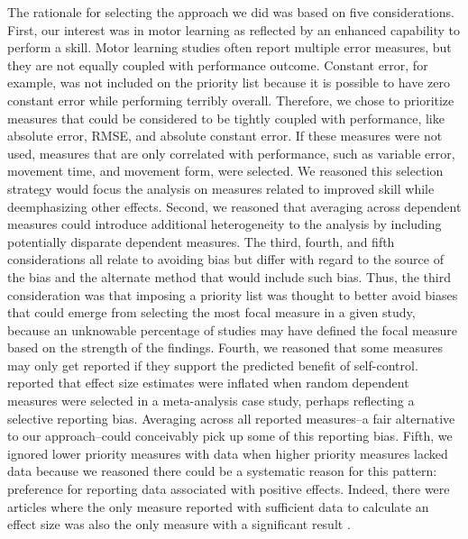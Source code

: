 \documentclass[man,floatsintext,hidelinks]{apa7}
\begin{document}
The rationale for selecting the approach we did was based on five considerations. First, our interest was in motor learning as reflected by an enhanced capability to perform a skill. Motor learning studies often report multiple error measures, but they are not equally coupled with performance outcome. Constant error, for example, was not included on the priority list because it is possible to have zero constant error while performing terribly overall. Therefore, we chose to prioritize measures that could be considered to be tightly coupled with performance, like absolute error, RMSE, and absolute constant error. If these measures were not used, measures that are only correlated with performance, such as variable error, movement time, and movement form, were selected. We reasoned this selection strategy would focus the analysis on measures related to improved skill while deemphasizing other effects. Second, we reasoned that averaging across dependent measures could introduce additional heterogeneity to the analysis by including potentially disparate dependent measures. The third, fourth, and fifth considerations all relate to avoiding bias but differ with regard to the source of the bias and the alternate method that would include such bias. Thus, the third consideration was that imposing a priority list was thought to better avoid biases that could emerge from selecting the most focal measure in a given study, because an unknowable percentage of studies may have defined the focal measure based on the strength of the findings. Fourth, we reasoned that some measures may only get reported if they support the predicted benefit of self-control. \Textcite{Scammacca2014-do} reported that effect size estimates were inflated when random dependent measures were selected in a meta-analysis case study, perhaps reflecting a selective reporting bias. Averaging across all reported measures--a fair alternative to our approach--could conceivably pick up some of this reporting bias. Fifth, we ignored lower priority measures with data when higher priority measures lacked data because we reasoned there could be a systematic reason for this pattern: preference for reporting data associated with positive effects. Indeed, there were articles where the only measure reported with sufficient data to calculate an effect size was also the only measure with a significant result \parencite[e.g.,][]{Wulf2005-sz}.
\end{document}
